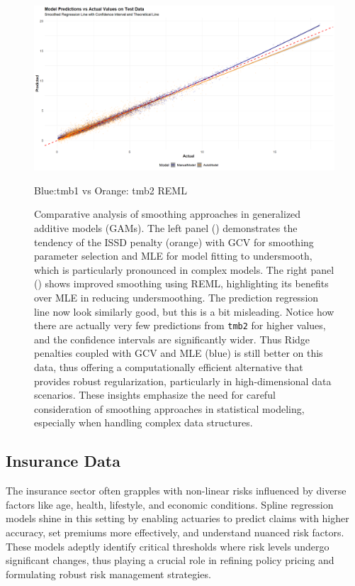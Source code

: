 \documentclass[12pt, twoside,hidelinks]{article}
\theoremstyle{definition}
\numberwithin{equation}{section}
\begin{document}
\begin{figure}[H]
\centering
\includegraphics[width=\textwidth]{visuals/colour_line_reml.png}
\caption{Blue:tmb1 vs Orange: tmb2 REML}
\label{fig:reml}

\caption[Comparative Analysis of Smoothing Approaches]{Comparative analysis of smoothing approaches in generalized additive models (GAMs). The left panel () demonstrates the tendency of the ISSD penalty (orange) with GCV for smoothing parameter selection and MLE for model fitting to undersmooth, which is particularly pronounced in complex models. The right panel () shows improved smoothing using REML, highlighting its benefits over MLE in reducing undersmoothing. The prediction regression line now look similarly good, but this is a bit misleading. Notice how there are actually very few predictions from \texttt{tmb2} for higher values, and the confidence intervals are significantly wider. Thus Ridge penalties coupled with GCV and MLE (blue) is still better on this data, thus offering a computationally efficient alternative that provides robust regularization, particularly in high-dimensional data scenarios. These insights emphasize the need for careful consideration of smoothing approaches in statistical modeling, especially when handling complex data structures.}
\label{fig:combined_smoothing}

\end{figure}

\newpage


\subsection{Insurance Data}
The insurance sector often grapples with non-linear risks influenced by diverse factors like age, health, lifestyle, and economic conditions. Spline regression models shine in this setting by enabling actuaries to predict claims with higher accuracy, set premiums more effectively, and understand nuanced risk factors. These models adeptly identify critical thresholds where risk levels undergo significant changes, thus playing a crucial role in refining policy pricing and formulating robust risk management strategies.
\end{document}
